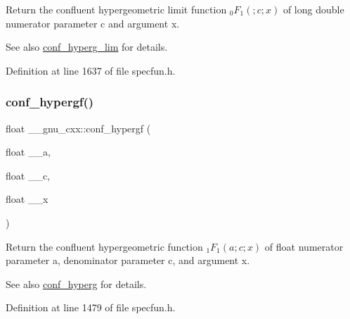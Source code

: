 Return the confluent hypergeometric limit function $ {}_0F_1(;c;x) $ of {\ttfamily long double} numerator parameter {\ttfamily c} and argument {\ttfamily x}.

\begin{DoxySeeAlso}{See also}
\hyperlink{group__mathsf__gnu_ga9fe7a5e2e741f56d88fd29bc249feab2}{conf\+\_\+hyperg\+\_\+lim} for details. 
\end{DoxySeeAlso}


Definition at line 1637 of file specfun.\+h.

\mbox{\label{group__mathsf__gnu_gabd18e600aa78c3f2b2f835039506c810}} 
\subsubsection{\texorpdfstring{conf\+\_\+hypergf()}{conf\_hypergf()}}
{\footnotesize\ttfamily float \+\_\+\+\_\+gnu\+\_\+cxx\+::conf\+\_\+hypergf (\begin{DoxyParamCaption}\item[{float}]{\+\_\+\+\_\+a,  }\item[{float}]{\+\_\+\+\_\+c,  }\item[{float}]{\+\_\+\+\_\+x }\end{DoxyParamCaption})\hspace{0.3cm}{\ttfamily [inline]}}

Return the confluent hypergeometric function $ {}_1F_1(a;c;x) $ of {\ttfamily float} numerator parameter {\ttfamily a}, denominator parameter {\ttfamily c}, and argument {\ttfamily x}.

\begin{DoxySeeAlso}{See also}
\hyperlink{group__mathsf__gnu_ga4d01e85e7d295afca5d9f8b6c68f19cc}{conf\+\_\+hyperg} for details. 
\end{DoxySeeAlso}


Definition at line 1479 of file specfun.\+h.

\mbox{\label{group__mathsf__gnu_ga0a9853f30d8fa515a12cd45a92da832e}} 
